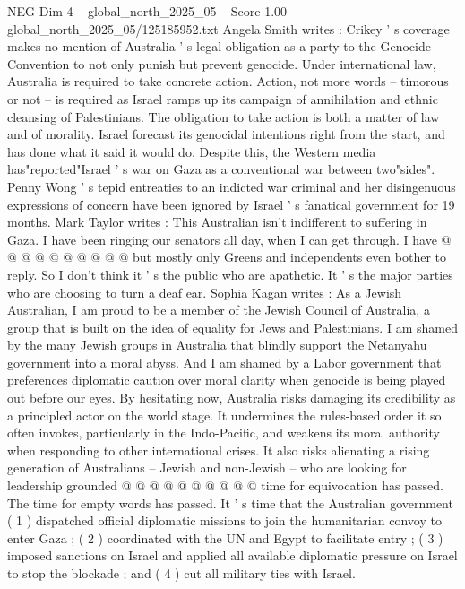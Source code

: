 \begin{textsample}{NEG Dim 4 – global\_north\_2025\_05 – Score 1.00 – global\_north\_2025\_05/125185952.txt}  \label{ex:f4_neg_250}
Angela Smith writes : Crikey ' s coverage makes no mention of Australia ' s legal obligation as a party to the Genocide Convention to not only punish but prevent genocide.
Under international law, Australia is required to take concrete action.
Action, not more words -- timorous or not -- is required as Israel ramps up its campaign of annihilation and ethnic cleansing of Palestinians.
The obligation to take action is both a matter of law and of morality.
Israel forecast its genocidal intentions right from the start, and has done what it said it would do.
Despite this, the Western media has"reported"Israel ' s war on Gaza as a conventional war between two"sides".
Penny Wong ' s tepid entreaties to an indicted war criminal and her disingenuous expressions of concern have been ignored by Israel ' s fanatical government for 19 months.
Mark Taylor writes : This Australian isn't indifferent to suffering in Gaza.
I have been ringing our senators all day, when I can get through.
I have @ @ @ @ @ @ @ @ @ @ but mostly only Greens and independents even bother to reply.
So I don't think it ' s the public who are apathetic.
It ' s the major parties who are choosing to turn a deaf ear.
Sophia Kagan writes : As a Jewish Australian, I am proud to be a member of the Jewish Council of Australia, a group that is built on the idea of equality for Jews and Palestinians.
I am shamed by the many Jewish groups in Australia that blindly support the Netanyahu government into a moral abyss.
And I am shamed by a Labor government that preferences diplomatic caution over moral clarity when genocide is being played out before our eyes.
By hesitating now, Australia risks damaging its credibility as a principled actor on the world stage.
It undermines the rules-based order it so often invokes, particularly in the Indo-Pacific, and weakens its moral authority when responding to other international crises.
It also risks alienating a rising generation of Australians -- Jewish and non-Jewish -- who are looking for leadership grounded @ @ @ @ @ @ @ @ @ @ time for equivocation has passed.
The time for empty words has passed.
It ' s time that the Australian government ( 1 ) dispatched official diplomatic missions to join the humanitarian convoy to enter Gaza ; ( 2 ) coordinated with the UN and Egypt to facilitate entry ; ( 3 ) imposed sanctions on Israel and applied all available diplomatic pressure on Israel to stop the blockade ; and ( 4 ) cut all military ties with Israel.

\end{textsample}
